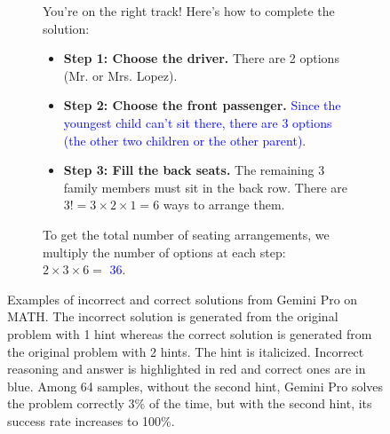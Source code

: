 \begin{figure}[h]
\begin{subfigure}{\linewidth}
\begin{tcolorbox}[colback=blue!5!white,colframe=mybrown!75!black]
\begin{small}
You're on the right track! Here's how to complete the solution:
\begin{itemize}
    \item \textbf{Step 1: Choose the driver.} There are 2 options (Mr. or Mrs. Lopez).
    \item \textbf{Step 2: Choose the front passenger.} \textcolor{blue}{Since the youngest child can't sit there, there are 3 options (the other two children or the other parent)}.
    \item \textbf{Step 3: Fill the back seats.} The remaining 3 family members must sit in the back row. There are $3! = 3 \times 2 \times 1 = 6$ ways to arrange them.
\end{itemize}
To get the total number of seating arrangements, we multiply the number of options at each step: \\
$2 \times 3 \times 6 =$ \textcolor{blue}{$\boxed{36}$}.

\end{small}
\end{tcolorbox}
\end{subfigure}\hfill
\caption{Examples of incorrect and correct solutions from Gemini Pro on MATH. The incorrect solution is generated from the original problem with 1 hint whereas the correct solution is generated from the original problem with 2 hints. The hint is italicized. Incorrect reasoning and answer is highlighted in red and correct ones are in blue. Among 64 samples, without the second hint, Gemini Pro solves the problem correctly 3\% of the time, but with the second hint, its success rate increases to 100\%.}
\label{fig:example_gotcha_step_more}
\end{figure}
\fi

